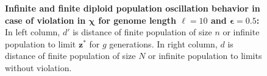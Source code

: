 \begin{figure}[H]
\begin{center}
\hspace{-3em}%
\vspace{-0.5em}  \hspace{-3em}%


\caption{\textbf{Infinite and finite diploid population oscillation behavior in case of violation in $\bm{\chi}$ for genome length $\ell = 10$ and $\bm{\epsilon} = 0.5$:} 
  In left column, $d'$ is distance of finite population of size $n$ or infinite population to limit $\bm{z}^\ast$ for $g$ generations. In right column, $d$ is distance of finite population of size $N$ or infinite population to limits without violation.}
\label{oscillation_10d_vio_chi_0.5}
\end{center}
\end{figure}

